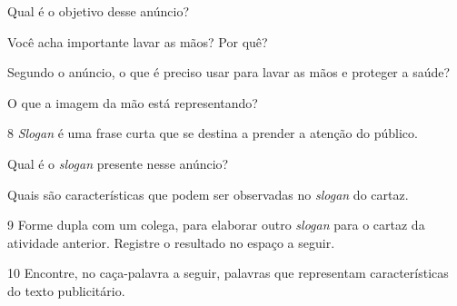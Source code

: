 \begin{escolha}[itemsep=-5pt]
\item Qual é o objetivo desse anúncio?

\item Você acha importante lavar as mãos? Por quê?

\item Segundo o anúncio, o que é preciso usar para lavar as mãos e proteger a saúde?

\item O que a imagem da mão está representando?
\end{escolha}

\num{8} \emph{Slogan} é uma frase curta que se destina a prender a atenção do
público. 

\begin{escolha}
\item Qual é o \emph{slogan} presente nesse anúncio?

\item Quais são características que podem ser observadas no \emph{slogan} do cartaz. 
\end{escolha}

\pagebreak
\num{9} Forme dupla com um colega, para elaborar outro \emph{slogan} para o cartaz da atividade anterior. Registre o resultado no espaço a seguir.


\begin{mdframed}[linewidth=2pt,linecolor=salmao,roundcorner=20pt]
\vspace{7cm}
\end{mdframed}

\num{10} Encontre, no caça-palavra a seguir, palavras que representam
características do texto publicitário.


